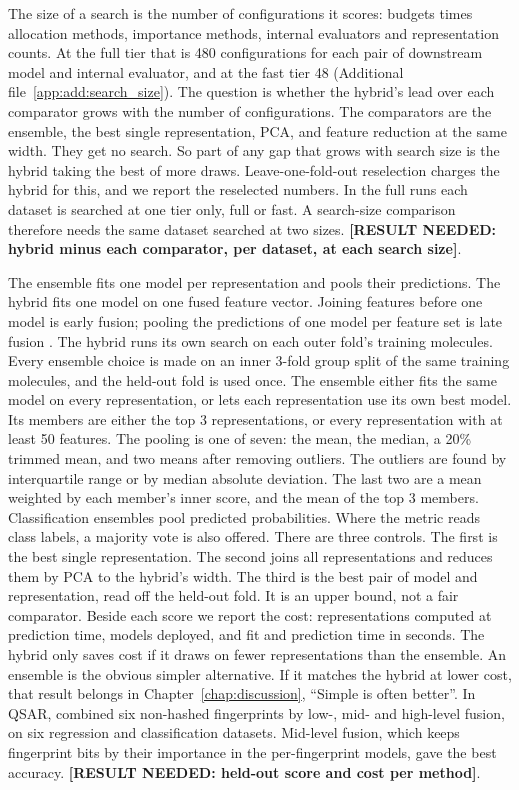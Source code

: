 The size of a search is the number of configurations it scores: budgets times allocation methods, importance methods, internal evaluators and representation counts. At the full tier that is 480 configurations for each pair of downstream model and internal evaluator, and at the fast tier 48 (Additional file~\ref{app:add:search_size}). The question is whether the hybrid's lead over each comparator grows with the number of configurations. The comparators are the ensemble, the best single representation, PCA, and feature reduction at the same width. They get no search. So part of any gap that grows with search size is the hybrid taking the best of more draws. Leave-one-fold-out reselection charges the hybrid for this, and we report the reselected numbers. In the full runs each dataset is searched at one tier only, full or fast. A search-size comparison therefore needs the same dataset searched at two sizes. \textbf{[RESULT NEEDED: hybrid minus each comparator, per dataset, at each search size]}.

The ensemble fits one model per representation and pools their predictions. The hybrid fits one model on one fused feature vector. Joining features before one model is early fusion; pooling the predictions of one model per feature set is late fusion \citep{Stahlschmidt2022}. The hybrid runs its own search on each outer fold's training molecules. Every ensemble choice is made on an inner 3-fold group split of the same training molecules, and the held-out fold is used once. The ensemble either fits the same model on every representation, or lets each representation use its own best model. Its members are either the top 3 representations, or every representation with at least 50 features. The pooling is one of seven: the mean, the median, a 20\% trimmed mean, and two means after removing outliers. The outliers are found by interquartile range or by median absolute deviation. The last two are a mean weighted by each member's inner score, and the mean of the top 3 members. Classification ensembles pool predicted probabilities. Where the metric reads class labels, a majority vote is also offered. There are three controls. The first is the best single representation. The second joins all representations and reduces them by PCA to the hybrid's width. The third is the best pair of model and representation, read off the held-out fold. It is an upper bound, not a fair comparator. Beside each score we report the cost: representations computed at prediction time, models deployed, and fit and prediction time in seconds. The hybrid only saves cost if it draws on fewer representations than the ensemble. An ensemble is the obvious simpler alternative. If it matches the hybrid at lower cost, that result belongs in Chapter~\ref{chap:discussion}, ``Simple is often better''. In QSAR, \citet{Turkina2025} combined six non-hashed fingerprints by low-, mid- and high-level fusion, on six regression and classification datasets. Mid-level fusion, which keeps fingerprint bits by their importance in the per-fingerprint models, gave the best accuracy. \textbf{[RESULT NEEDED: held-out score and cost per method]}.

